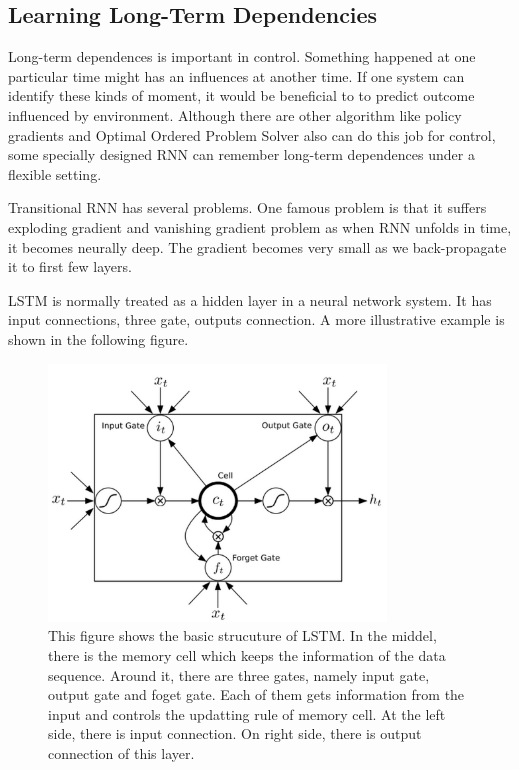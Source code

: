 \documentclass[officiallayout]{tktla}
\begin{document}
\subsection{Learning Long-Term Dependencies}

Long-term dependences is important in control. Something happened at one particular time might has an influences at another time. If one system can identify these kinds of moment, it would be beneficial to to predict outcome influenced by environment. Although there are other algorithm like policy gradients and Optimal Ordered Problem Solver also can do this job for control, some specially designed RNN can remember long-term dependences under a flexible setting. 

Transitional RNN has several problems. One famous problem is that it suffers exploding gradient and vanishing gradient problem as when RNN unfolds in time, it becomes neurally deep. The gradient becomes very small as we back-propagate it to first few layers.


LSTM is normally treated as a hidden layer in a neural network system. It has input connections, three gate, outputs connection. A more illustrative example is shown in the following figure.

\begin{figure}[h!]
  \centering
    \includegraphics[width=0.8\textwidth]{lstm}
  \caption{This figure shows the basic strucuture of LSTM. In the middel, there is the memory cell which keeps the information of the data sequence. Around it, there are three gates, namely input gate, output gate and foget gate. Each of them gets information from the input and controls the updatting rule of memory cell. At the left side, there is input connection. On right side, there is output connection of this layer.}\label{series_prediction_rnn}
\end{figure}
\end{document}
